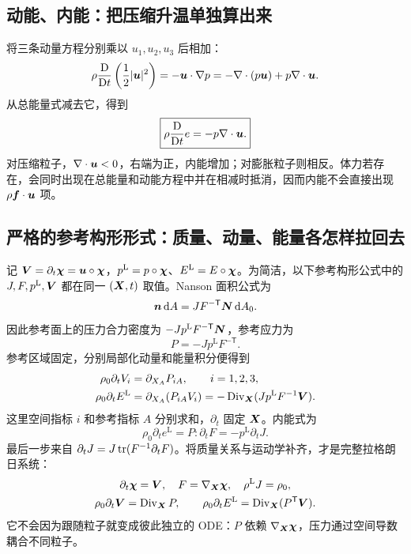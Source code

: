 \subsection{动能、内能：把压缩升温单独算出来}

将三条动量方程分别乘以 $u_1,u_2,u_3$ 后相加：
\begin{equation}
 \rho\frac{\mathrm D}{\mathrm Dt}\left(\frac12|\bm{u}|^2\right)=-\bm{u}\cdot\nabla p
 =-\nabla\cdot(p\bm{u})+p\nabla\cdot\bm{u}.
 \label{eq:euler-kinetic}
\end{equation}
从总能量式减去它，得到
\begin{equation}
 \boxed{\rho\frac{\mathrm D}{\mathrm Dt} e=-p\nabla\cdot\bm{u}.}\label{eq:euler-internal}
\end{equation}
对压缩粒子，$\nabla\cdot\bm{u}<0$，右端为正，内能增加；对膨胀粒子则相反。体力若存在，会同时出现在总能量和动能方程中并在相减时抵消，因而内能不会直接出现 $\rho\bm{f}\cdot\bm{u}$ 项。

\subsection{严格的参考构形形式：质量、动量、能量各怎样拉回去}

记 $\bm{V}=\partial_t\bm{\chi}=\bm{u}\circ\bm{\chi}$，$p^{\mathrm L}=p\circ\bm{\chi}$、$E^{\mathrm L}=E\circ\bm{\chi}$。为简洁，以下参考构形公式中的 $J,F,p^{\mathrm L},\bm{V}$ 都在同一 $(\bm{X},t)$ 取值。Nanson 面积公式为
\begin{equation}
 \bm{n}\,\mathrm d A=JF^{-\mathsf T}\bm{N}\,\mathrm d A_0.
\end{equation}
因此参考面上的压力合力密度为 $-Jp^{\mathrm L}F^{-\mathsf T}\bm{N}$，参考应力为
\begin{equation}
 P=-Jp^{\mathrm L}F^{-\mathsf T}.
\end{equation}
参考区域固定，分别局部化动量和能量积分便得到
\begin{align}
 \rho_0\partial_t V_i&=\partial_{X_A}P_{iA},\qquad i=1,2,3,\label{eq:euler-reference-momentum}\\
 \rho_0\partial_t E^{\mathrm L}
 &=\partial_{X_A}(P_{iA}V_i)
 =-\operatorname{Div}_{\bm{X}}(Jp^{\mathrm L}F^{-1}\bm{V}).
 \label{eq:euler-reference-energy}
\end{align}
这里空间指标 $i$ 和参考指标 $A$ 分别求和，$\partial_t$ 固定 $\bm{X}$。内能式为
\begin{equation}
 \rho_0\partial_t e^{\mathrm L}=P:\partial_t F
 =-p^{\mathrm L}\partial_tJ.
\end{equation}
最后一步来自 $\partial_tJ=J\operatorname{tr}(F^{-1}\partial_tF)$。将质量关系与运动学补齐，才是完整拉格朗日系统：
\begin{equation}
 \begin{gathered}
 \partial_t\bm{\chi}=\bm{V},\quad F=\nabla_{\bm{X}}\bm{\chi},
 \quad\rho^{\mathrm L}J=\rho_0,\\
 \rho_0\partial_t\bm{V}=\operatorname{Div}_{\bm{X}}P,\qquad
 \rho_0\partial_tE^{\mathrm L}=\operatorname{Div}_{\bm{X}}(P^{\mathsf T}\bm{V}).
 \end{gathered}
\end{equation}
它不会因为跟随粒子就变成彼此独立的 ODE：$P$ 依赖 $\nabla_{\bm{X}}\bm{\chi}$，压力通过空间导数耦合不同粒子。

